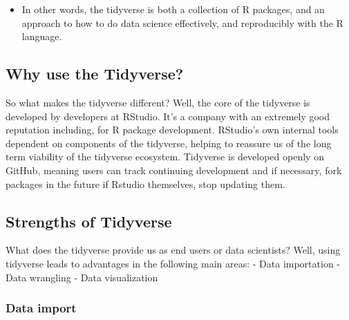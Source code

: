 \documentclass[
]{article}
\providecommand{\tightlist}{%
  \setlength{\itemsep}{0pt}\setlength{\parskip}{0pt}}
\begin{document}
\begin{itemize}
\tightlist
\item
  In other words, the tidyverse is both a collection of R packages, and an approach to how to do data science effectively, and reproducibly with the R language.
\end{itemize}

\hypertarget{why-use-the-tidyverse}{%
\subsection{Why use the Tidyverse?}\label{why-use-the-tidyverse}}

So what makes the tidyverse different? Well, the core of the tidyverse is developed by developers at RStudio. It's a company with an extremely good reputation including, for R package development. RStudio's own internal tools dependent on components of the tidyverse, helping to reassure us of the long term viability of the tidyverse ecosystem. Tidyverse is developed openly on GitHub, meaning users can track continuing development and if necessary, fork packages in the future if Rstudio themselves, stop updating them.

\hypertarget{strengths-of-tidyverse}{%
\subsection{Strengths of Tidyverse}\label{strengths-of-tidyverse}}

What does the tidyverse provide us as end users or data scientists? Well, using tidyverse leads to advantages in the following main areas:
- Data importation
- Data wrangling
- Data visualization

\hypertarget{data-import}{%
\subsubsection{Data import}\label{data-import}}
\end{document}
